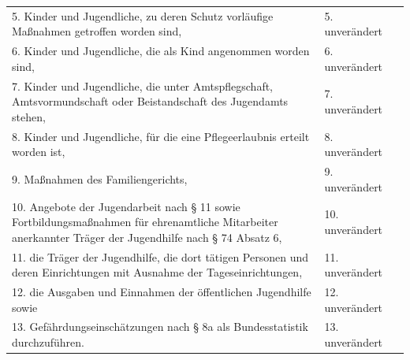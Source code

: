 \documentclass[10pt,a4paper,landscape]{article}
\begin{document}
\begin{longtable}{|L{8.2cm}|L{8.2cm}|L{8.2cm}|}
\hhline{|---|}
5.   \newline Kinder und Jugendliche, zu deren Schutz  \newline vorläufige Maßnahmen getroffen worden  \newline sind, & 5. unverändert &  \\
\hhline{|---|}
6.   \newline Kinder und Jugendliche, die als Kind  \newline angenommen worden sind, & 6. unverändert &  \\
\hhline{|---|}
7.   \newline Kinder und Jugendliche, die unter  \newline Amtspflegschaft, Amtsvormundschaft oder  \newline Beistandschaft des Jugendamts stehen, & 7. unverändert &  \\
\hhline{|---|}
8.   \newline Kinder und Jugendliche, für die eine  \newline Pflegeerlaubnis erteilt worden ist, & 8. unverändert &  \\
\hhline{|---|}
9.   \newline Maßnahmen des Familiengerichts, & 9. unverändert &  \\
\hhline{|---|}
10.   \newline Angebote der Jugendarbeit nach \S{} 11  \newline sowie Fortbildungsmaßnahmen für  \newline ehrenamtliche Mitarbeiter anerkannter  \newline Träger der Jugendhilfe nach \S{} 74 Absatz 6, & 10. unverändert &  \\
\hhline{|---|}
11.   \newline die Träger der Jugendhilfe, die dort tätigen  \newline Personen und deren Einrichtungen mit  \newline Ausnahme der Tageseinrichtungen, & 11. unverändert &  \\
\hhline{|---|}
12.   \newline die Ausgaben und Einnahmen der  \newline öffentlichen Jugendhilfe sowie & 12. unverändert &  \\
\hhline{|---|}
13.   \newline Gefährdungseinschätzungen nach \S{} 8a als  \newline Bundesstatistik durchzuführen. & 13. unverändert &  \\

\end{longtable}
\end{document}
